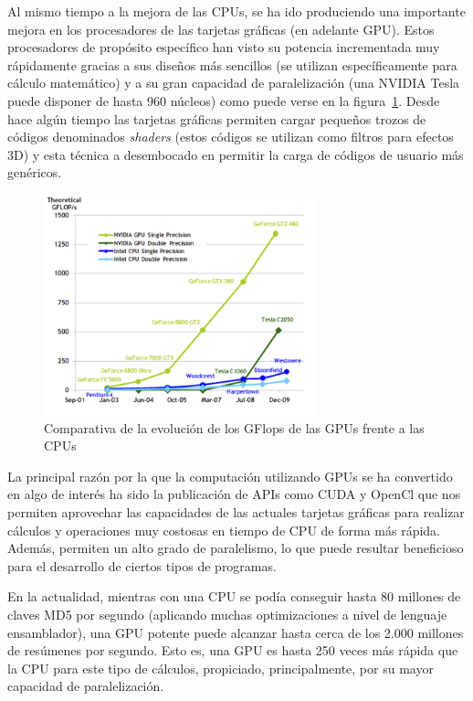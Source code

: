 Al mismo tiempo a la mejora de las CPUs, se ha ido produciendo una importante mejora en los procesadores de las tarjetas gráficas (en adelante GPU). Estos procesadores de propósito específico han visto su potencia incrementada muy rápidamente gracias a sus diseños más sencillos (se utilizan específicamente para cálculo matemático) y a su gran capacidad de paralelización (una NVIDIA Tesla puede disponer de hasta 960 núcleos) como puede verse en la figura~\ref{fig:GPUvsCPU}. Desde hace algún tiempo las tarjetas gráficas permiten cargar pequeños trozos de códigos denominados \emph{shaders} (estos códigos se utilizan como filtros para efectos 3D) y esta técnica a desembocado en permitir la carga de códigos de usuario más genéricos.

\begin{figure}
	\centering
	\includegraphics[width=0.7\textwidth]{images/evolucion-gpu.png}
	\caption{Comparativa de la evolución de los GFlops de las GPUs frente a las CPUs\cite{nvidia:cuda_c_programming_guide}}\label{fig:GPUvsCPU}
\end{figure}

La principal razón por la que la computación utilizando GPUs se ha convertido en algo de interés ha sido la publicación de APIs como CUDA y OpenCl que nos permiten aprovechar las capacidades de las actuales tarjetas gráficas para realizar cálculos y operaciones muy costosas en tiempo de CPU de forma más rápida. Además, permiten un alto grado de paralelismo, lo que puede resultar beneficioso para el desarrollo de ciertos tipos de programas.

En la actualidad, mientras con una CPU se podía conseguir hasta 80 millones de claves MD5 por segundo (aplicando muchas optimizaciones a nivel de lenguaje ensamblador), una GPU potente puede alcanzar hasta cerca de los 2.000 millones de resúmenes por segundo. Esto es, una GPU es hasta 250 veces más rápida que la CPU para este tipo de cálculos, propiciado, principalmente, por su mayor capacidad de paralelización.

